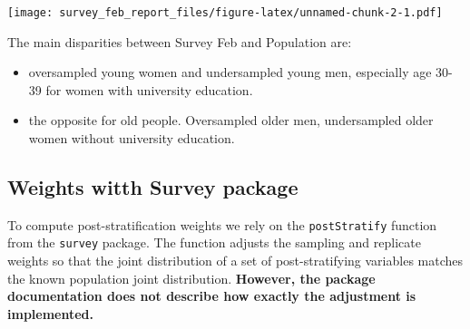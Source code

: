 \documentclass[
]{article}
\newenvironment{Shaded}{\begin{snugshade}}{\end{snugshade}}
\newcommand{\AttributeTok}[1]{\textcolor[rgb]{0.13,0.29,0.53}{#1}}
\newcommand{\CommentTok}[1]{\textcolor[rgb]{0.56,0.35,0.01}{\textit{#1}}}
\newcommand{\ConstantTok}[1]{\textcolor[rgb]{0.56,0.35,0.01}{#1}}
\newcommand{\DecValTok}[1]{\textcolor[rgb]{0.00,0.00,0.81}{#1}}
\newcommand{\DocumentationTok}[1]{\textcolor[rgb]{0.56,0.35,0.01}{\textbf{\textit{#1}}}}
\newcommand{\FunctionTok}[1]{\textcolor[rgb]{0.13,0.29,0.53}{\textbf{#1}}}
\newcommand{\NormalTok}[1]{#1}
\newcommand{\OtherTok}[1]{\textcolor[rgb]{0.56,0.35,0.01}{#1}}
\newcommand{\SpecialCharTok}[1]{\textcolor[rgb]{0.81,0.36,0.00}{\textbf{#1}}}
\providecommand{\tightlist}{%
  \setlength{\itemsep}{0pt}\setlength{\parskip}{0pt}}
\begin{document}
\texttt{[image: survey\_feb\_report\_files/figure-latex/unnamed-chunk-2-1.pdf]}

The main disparities between Survey Feb and Population are:

\begin{itemize}
\tightlist
\item
  oversampled young women and undersampled young men, especially age
  30-39 for women with university education.
\item
  the opposite for old people. Oversampled older men, undersampled older
  women without university education.
\end{itemize}

\hypertarget{weights-witth-survey-package}{%
\subsection{Weights witth Survey
package}\label{weights-witth-survey-package}}

To compute post-stratification weights we rely on the
\texttt{postStratify} function from the \texttt{survey} package. The
function adjusts the sampling and replicate weights so that the joint
distribution of a set of post-stratifying variables matches the known
population joint distribution. \textbf{However, the package
documentation does not describe how exactly the adjustment is
implemented.}

\begin{Shaded}
\end{Shaded}
\end{document}
